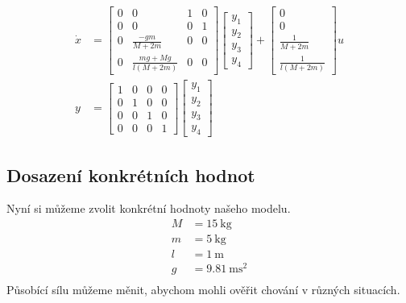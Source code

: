 \documentclass[a4paper, 12pt]{article}
\begin{document}
			\begin{align*}
				\dot{x}&=\left[\begin{matrix}
					0 & 0 & 1 & 0\\
					0 & 0 & 0 & 1\\
					0 & \frac{-gm}{M+2m} & 0 & 0\\
					0 & \frac{mg+Mg}{l\left(M+2m\right)} & 0 & 0
				\end{matrix}\right]
				\left[\begin{matrix}
					y_1\\
					y_2\\
					y_3\\
					y_4
				\end{matrix}\right]
				+
				\left[\begin{matrix}
					0\\
					0\\
					\frac{1}{M+2m}\\
					\frac{1}{l\left(M+2m\right)}
				\end{matrix}\right]u\\
				y&=\left[\begin{matrix}
					1 & 0 & 0 & 0\\
					0 & 1 & 0 & 0\\
					0 & 0 & 1 & 0\\
					0 & 0 & 0 & 1
				\end{matrix}\right]
				\left[\begin{matrix}
					y_1\\
					y_2\\
					y_3\\
					y_4
				\end{matrix}\right]
			\end{align*}
		\subsection{Dosazení konkrétních hodnot}
			Nyní si můžeme zvolit konkrétní hodnoty našeho modelu. 
			\begin{align*}
				M &= \SI{15}{\kilo\gram}\\
				m &= \SI{5}{\kilo\gram}\\
				l &= \SI{1}{\meter}\\
				g &= \SI{9,81}{\meter\square\second}\\
			\end{align*}
			Působící sílu můžeme měnit, abychom mohli ověřit chování v různých situacích.
		\clearpage
\end{document}
